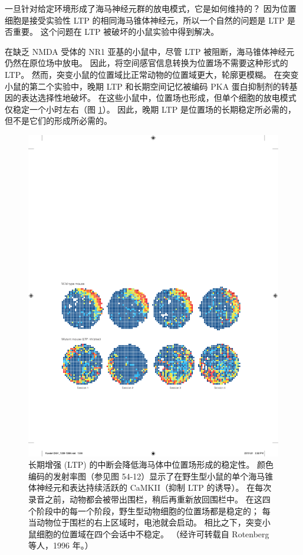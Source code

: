 一旦针对给定环境形成了海马神经元群的放电模式，它是如何维持的？
因为位置细胞是接受实验性 LTP 的相同海马锥体神经元，所以一个自然的问题是 LTP 是否重要。
这个问题在 LTP 被破坏的小鼠实验中得到解决。


在缺乏 NMDA 受体的 NR1 亚基的小鼠中，尽管 LTP 被阻断，海马锥体神经元仍然在原位场中放电。
因此，将空间感官信息转换为位置场不需要这种形式的 LTP。
然而，突变小鼠的位置域比正常动物的位置域更大，轮廓更模糊。
在突变小鼠的第二个实验中，晚期 LTP 和长期空间记忆被编码 PKA 蛋白抑制剂的转基因的表达选择性地破坏。 在这些小鼠中，位置场也形成，但单个细胞的放电模式仅稳定一个小时左右（图 \ref{fig:54_16}）。
因此，晚期 LTP 是位置场的长期稳定所必需的，但不是它们的形成所必需的。


\begin{figure}[htbp]
	\centering
	\includegraphics[width=0.9\linewidth]{chap54/fig_54_16}
	\caption{长期增强 (LTP) 的中断会降低海马体中位置场形成的稳定性。 颜色编码的发射率图（参见图 54-12）显示了在野生型小鼠的单个海马锥体神经元和表达持续活跃的 CaMKII（抑制 LTP 的诱导）。 在每次录音之前，动物都会被带出围栏，稍后再重新放回围栏中。 在这四个阶段中的每一个阶段，野生型动物细胞的位置场都是稳定的； 每当动物位于围栏的右上区域时，电池就会启动。 相比之下，突变小鼠细胞的位置域在四个会话中不稳定。 （经许可转载自 Rotenberg 等人，1996 年。）}
	\label{fig:54_16}
\end{figure}


